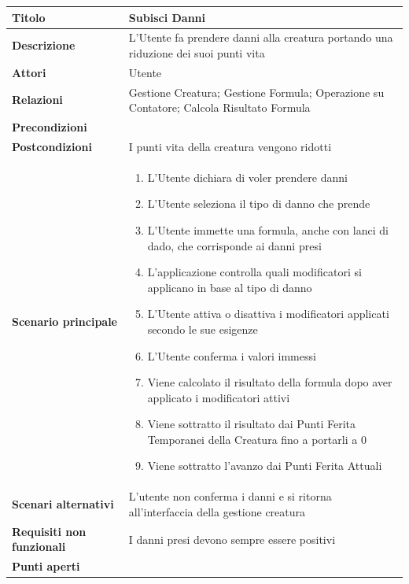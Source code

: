 \documentclass[a4paper, 11pt]{article}
\begin{document}
\begin{center}
\begin{tabular}{ |p{5cm}|p{9.5cm}|  }
\hline
\textbf{Titolo} & Subisci Danni \\
\hline
\textbf{Descrizione} & L'Utente fa prendere danni alla creatura portando una riduzione dei suoi punti vita \\
\hline
\textbf{Attori} & Utente \\
\hline
\textbf{Relazioni} & Gestione Creatura; Gestione Formula; Operazione su Contatore; Calcola Risultato Formula \\
\hline
\textbf{Precondizioni} & \\
\hline
\textbf{Postcondizioni} & I punti vita della creatura vengono ridotti \\
\hline
\textbf{Scenario principale} & 
\begin{enumerate}
    \item L'Utente dichiara di voler prendere danni
    \item L'Utente seleziona il tipo di danno che prende
    \item L'Utente immette una formula, anche con lanci di dado, che corrisponde ai danni presi
    \item L'applicazione controlla quali modificatori si applicano in base al tipo di danno
    \item L'Utente attiva o disattiva i modificatori applicati secondo le sue esigenze
    \item L'Utente conferma i valori immessi
    \item Viene calcolato il risultato della formula dopo aver applicato i modificatori attivi
    \item Viene sottratto il risultato dai Punti Ferita Temporanei della Creatura fino a portarli a 0
    \item Viene sottratto l'avanzo dai Punti Ferita Attuali
\end{enumerate}\\
\hline
\textbf{Scenari alternativi} & L'utente non conferma i danni e si ritorna all'interfaccia della gestione creatura\\
\hline
\textbf{Requisiti non funzionali} & I danni presi devono sempre essere positivi \\
\hline
\textbf{Punti aperti} & \\
\hline
\end{tabular}

\vspace{3em}


\end{center}
\end{document}
